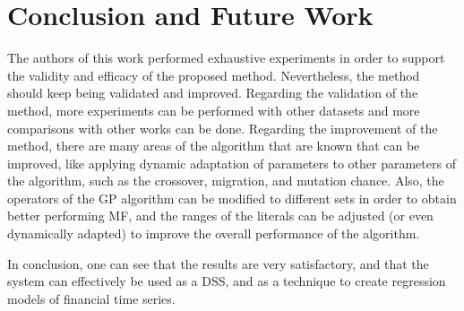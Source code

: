 \documentclass[12pt,journal,compsoc]{IEEEtran}
\begin{document}
\section{Conclusion and Future Work}
\label{conclusions}

The authors of this work performed exhaustive experiments in order to support the validity and efficacy of the proposed method. Nevertheless, the method should keep being validated and improved. Regarding the validation of the method, more experiments can be performed with other datasets and more comparisons with other works can be done. Regarding the improvement of the method, there are many areas of the algorithm that are known that can be improved, like applying dynamic adaptation of parameters to other parameters of the algorithm, such as the crossover, migration, and mutation chance. Also, the operators of the GP algorithm can be modified to different sets in order to obtain better performing MF, and the ranges of the literals can be adjusted (or even dynamically adapted) to improve the overall performance of the algorithm.

In conclusion, one can see that the results are very satisfactory, and that the system can effectively be used as a DSS, and as a technique to create regression models of financial time series.



\end{document}
